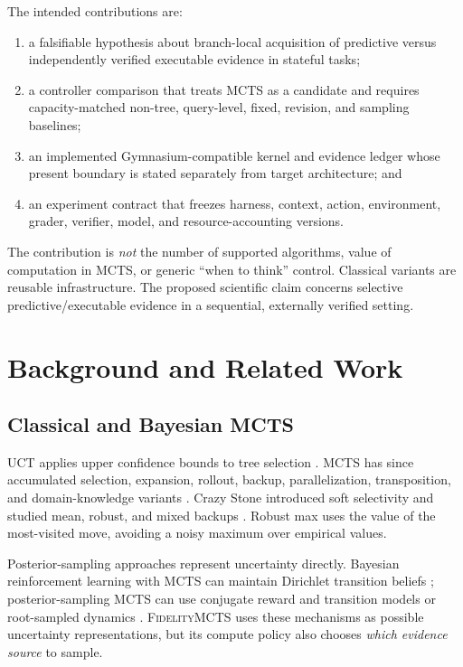 \documentclass[10pt,twocolumn]{article}
\newcommand{\method}{\textsc{FidelityMCTS}\xspace}
\begin{document}
The intended contributions are:

\begin{enumerate}[leftmargin=1.25em,itemsep=0.2em,topsep=0.3em]
    \item a falsifiable hypothesis about branch-local acquisition of predictive
    versus independently verified executable evidence in stateful tasks;
    \item a controller comparison that treats MCTS as a candidate and requires
    capacity-matched non-tree, query-level, fixed, revision, and sampling
    baselines;
    \item an implemented Gymnasium-compatible kernel and evidence ledger whose
    present boundary is stated separately from target architecture; and
    \item an experiment contract that freezes harness, context, action,
    environment, grader, verifier, model, and resource-accounting versions.
\end{enumerate}

The contribution is \emph{not} the number of supported algorithms, value of
computation in MCTS, or generic ``when to think'' control. Classical variants
are reusable infrastructure. The proposed scientific claim concerns selective
predictive/executable evidence in a sequential, externally verified setting.

\section{Background and Related Work}

\subsection{Classical and Bayesian MCTS}

UCT applies upper confidence bounds to tree selection
\citep{kocsis2006bandit}. MCTS has since accumulated selection, expansion,
rollout, backup, parallelization, transposition, and domain-knowledge variants
\citep{browne2012survey}. Crazy Stone introduced soft selectivity and studied
mean, robust, and mixed backups \citep{coulom2006efficient}. Robust max uses the
value of the most-visited move, avoiding a noisy maximum over empirical values.

Posterior-sampling approaches represent uncertainty directly. Bayesian
reinforcement learning with MCTS can maintain Dirichlet transition beliefs
\citep{vien2013mcts}; posterior-sampling MCTS can use conjugate reward and
transition models or root-sampled dynamics
\citep{bai2018posterior}. \method uses these mechanisms as possible uncertainty
representations, but its compute policy also chooses \emph{which evidence
source} to sample.
\end{document}
